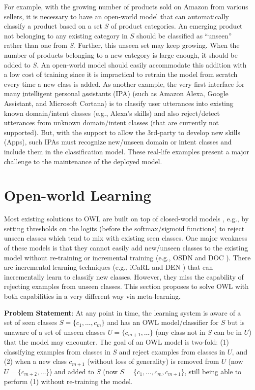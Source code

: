For example, with the growing number of products sold on Amazon from various sellers, it is necessary to have an open-world model that can automatically classify a product based on a set $S$ of product categories.
An emerging product not belonging to any existing category in $S$ should be classified as ``unseen'' rather than one from $S$.
Further, this unseen set may keep growing. When the number of products belonging to a new category is large enough, it should be added to $S$.
An open-world model should easily accommodate this addition with a low cost of training since it is impractical to retrain the model from scratch every time a new class is added.
As another example, the very first interface for many \underline{i}ntelligent \underline{p}ersonal \underline{a}ssistants (IPA) (such as Amazon Alexa, Google Assistant, and Microsoft Cortana) is to classify user utterances into existing known domain/intent classes (e.g., Alexa's skills) and also 
reject/detect utterances from unknown domain/intent classes (that are currently not supported).
But, with the support to allow the 3rd-party to develop new skills (Apps), such IPAs must recognize new/unseen domain or intent classes and include them in the classification model. These real-life examples present a major challenge to the maintenance of the deployed model.

\section{Open-world Learning}
Most existing solutions to OWL are built on top of closed-world models \cite{bendale2015towards,bendale2016towards,fei2016learning,shu-xu-liu:2017:EMNLP2017}, e.g., by setting thresholds on the logits (before the softmax/sigmoid functions) to reject unseen classes which tend to mix with existing seen classes. One major weakness of these models is that they cannot easily add new/unseen classes to the existing model without re-training or incremental training (e.g., OSDN \cite{bendale2016towards} and DOC \cite{shu-xu-liu:2017:EMNLP2017}).
There are incremental learning techniques (e.g., iCaRL \cite{rebuffi2017icarl} and DEN \cite{lee2017lifelong}) that can incrementally learn to classify new classes. However, they miss the capability of rejecting examples from unseen classes.
This section proposes to solve OWL with both capabilities in a very different way via meta-learning.

\textbf{Problem Statement}: At any point in time, the learning system is aware of a set of seen classes $S=\{c_1, \dots, c_m\}$
and has an OWL model/classifier for $S$ but is unaware of a set of unseen classes $U=\{c_{m+1}, \dots\}$ (any class not in $S$ can be in $U$) that the model may encounter. The goal of an OWL model is two-fold: (1) classifying examples from classes in $S$ and reject examples from classes in $U$, and (2) when a new class $c_{m+1}$ (without loss of generality) is removed from $U$ (now $U=\{c_{m+2}, \dots\}$) and added to $S$ (now $S=\{c_1, \dots, c_m, c_{m+1}\}$, still being able to perform (1) without re-training the model.

